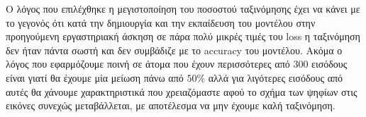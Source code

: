 \documentclass[12pt,a4paper]{article}
\newcommand{\tl}{\textlatin}
\begin{document}
\begin{enumerate}[a)]
\begin{itemize}
                    \end{itemize}
                    Ο λόγος που επιλέχθηκε η μεγιστοποίηση του ποσοστού
                    ταξινόμησης έχει να κάνει με το γεγονός ότι κατά την δημιουργία και την
                    εκπαίδευση του μοντέλου στην προηγούμενη εργαστηριακή άσκηση
                    σε πάρα πολύ μικρές τιμές του \tl{loss} η ταξινόμηση δεν
                    ήταν πάντα σωστή και δεν συμβάδιζε με το \tl{accuracy} του
                    μοντέλου. Ακόμα ο λόγος που εφαρμόζουμε ποινή σε άτομα που
                    έχουν περισσότερες από $300$ εισόδους είναι γιατί θα έχουμε
                    μία μείωση πάνω από $50\%$ αλλά για λιγότερες εισόδους από αυτές θα
                    χάνουμε χαρακτηριστικά που χρειαζόμαστε αφού το σχήμα των
                    ψηφίων στις εικόνες συνεχώς μεταβάλλεται, με αποτέλεσμα να
                    μην έχουμε καλή ταξινόμηση.


\end{enumerate}
\end{document}
